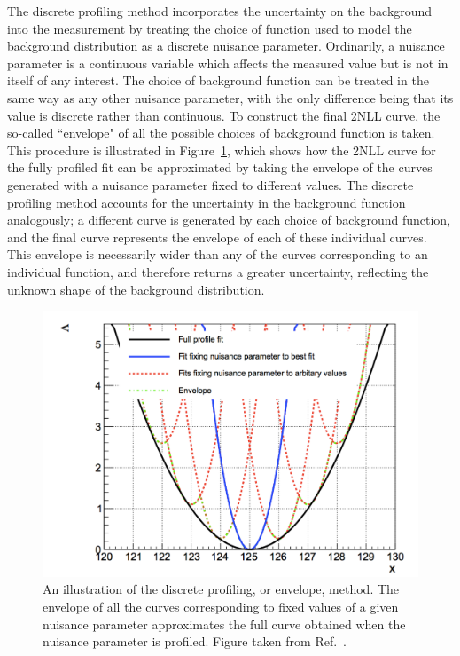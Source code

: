 The discrete profiling method incorporates the uncertainty on the background 
into the measurement by treating the choice of function used to model the background distribution
as a discrete nuisance parameter.
Ordinarily, a nuisance parameter is a continuous variable which affects the measured value 
but is not in itself of any interest.
The choice of background function can be treated in the same way as any other nuisance parameter, 
with the only difference being that its value is discrete rather than continuous.
To construct the final 2NLL curve, 
the so-called ``envelope" of all the possible choices of background function is taken.
This procedure is illustrated in Figure~\ref{fig:sigbkg_envelope}, 
which shows how the 2NLL curve for the fully profiled fit can be approximated 
by taking the envelope of the curves generated with a nuisance parameter fixed to different values.
The discrete profiling method accounts for the uncertainty in the background function analogously;
a different curve is generated by each choice of background function, 
and the final curve represents the envelope of each of these individual curves.
This envelope is necessarily wider than any of the curves corresponding to an individual function, 
and therefore returns a greater uncertainty, 
reflecting the unknown shape of the background distribution.

\begin{figure}[hptb]
 \centering
 \includegraphics[width=\textwidth]{Figures/SigBkg/EnvelopeIllustration.pdf}
 \caption[Illustration of the discrete profiling method.]
 {
   An illustration of the discrete profiling, or envelope, method.
   The envelope of all the curves corresponding to fixed values of a given nuisance parameter
   approximates the full curve obtained when the nuisance parameter is profiled.
   Figure taken from Ref.~\cite{Envelope}.
 }
 \label{fig:sigbkg_envelope}
\end{figure}

